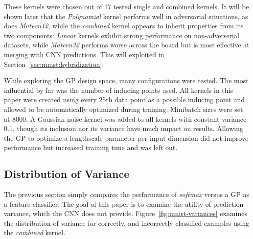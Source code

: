 \documentclass{article}
\begin{document}


These kernels were chosen out of 17 tested single and combined kernels. It will be shown later that the \textit{Polynomial} kernel performs well in adversarial situations, as does \textit{Matern12}, while the \textit{combined} kernel appears to inherit properties from its two components: \textit{Linear} kernels exhibit strong performance on non-adverserial datasets, while \textit{Matern32} performs worse across the board but is most effective at merging with CNN predictions. This will exploited in  Section~\ref{sec:mnist:hybridization}.

While exploring the GP design space, many configurations were tested. The most influential by far was the number of inducing points used. All kernels in this paper were created using every 25th data point as a possible inducing point and allowed to be automatically optimized during training. Minibatch sizes were set at 8000. A Gaussian noise kernel was added to all kernels with constant variance 0.1, though its inclusion nor its variance have much impact on results. Allowing the GP to optimize a lengthscale parameter per input dimension did not improve performance but increased training time and was left out.



\subsection{Distribution of Variance}

The previous section simply compares the performance of \textit{softmax} versus a GP as a feature classifier. The goal of this paper is to examine the utility of prediction variance, which the CNN does not provide. Figure~\ref{fig:mnist-variances} examines the distribution of variance for correctly, and incorrectly classified examples using the \textit{combined} kernel.
\end{document}
